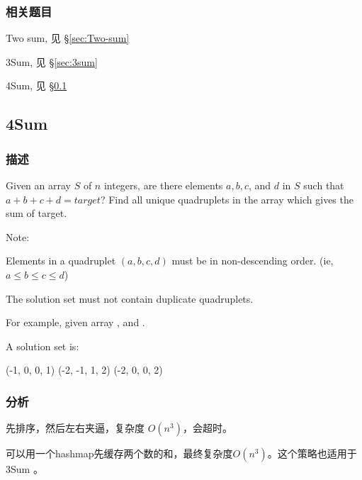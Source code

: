 \subsubsection{相关题目}
\begindot
\item Two sum, 见 \S \ref{sec:Two-sum}
\item 3Sum, 见 \S \ref{sec:3sum}
\item 4Sum, 见 \S \ref{sec:4sum}
\myenddot


\subsection{4Sum} %
\label{sec:4sum}


\subsubsection{描述}
Given an array $S$ of $n$ integers, are there elements $a, b, c$, and $d$ in $S$ such that $a + b + c + d = target$? Find all unique quadruplets in the array which gives the sum of target.

Note:
\begindot
\item Elements in a quadruplet $(a,b,c,d)$ must be in non-descending order. (ie, $a \leq b \leq c \leq d$)
\item The solution set must not contain duplicate quadruplets.
\myenddot

For example, given array , and . 

A solution set is:
\begin{Code}
(-1,  0, 0, 1)
(-2, -1, 1, 2)
(-2,  0, 0, 2)
\end{Code}


\subsubsection{分析}
先排序，然后左右夹逼，复杂度 $O(n^3)$，会超时。

可以用一个hashmap先缓存两个数的和，最终复杂度$O(n^3)$。这个策略也适用于 3Sum 。


